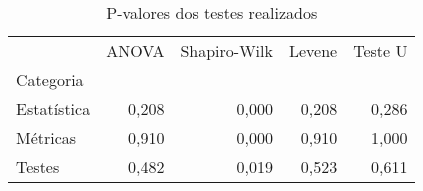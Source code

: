 \begin{table}
\caption{P-valores dos testes realizados}
\begin{tabular}{lrrrr}
 & ANOVA & Shapiro-Wilk & Levene & Teste U \\
Categoria &  &  &  &  \\
Estatística & 0,208 & 0,000 & 0,208 & 0,286 \\
Métricas & 0,910 & 0,000 & 0,910 & 1,000 \\
Testes & 0,482 & 0,019 & 0,523 & 0,611 \\
\end{tabular}
\end{table}
